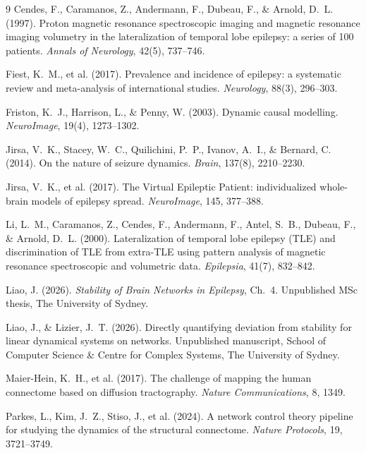 \documentclass[11pt,a4paper]{article}
\begin{document}
\begin{thebibliography}{9}
\small
{} Cendes, F., Caramanos, Z., Andermann, F., Dubeau, F., \& Arnold, D.~L. (1997). Proton magnetic resonance spectroscopic imaging and magnetic resonance imaging volumetry in the lateralization of temporal lobe epilepsy: a series of 100 patients. \emph{Annals of Neurology}, 42(5), 737--746.

 Fiest, K.~M., et al. (2017). Prevalence and incidence of
epilepsy: a systematic review and meta-analysis of international studies. \emph{Neurology},
88(3), 296--303.

 Friston, K.~J., Harrison, L., \& Penny, W. (2003). Dynamic causal modelling. \emph{NeuroImage}, 19(4), 1273--1302.

 Jirsa, V.~K., Stacey, W.~C., Quilichini, P.~P., Ivanov, A.~I., \& Bernard, C. (2014). On the nature
of seizure dynamics. \emph{Brain}, 137(8), 2210--2230.

 Jirsa, V.~K., et al. (2017). The Virtual Epileptic Patient:
individualized whole-brain models of epilepsy spread. \emph{NeuroImage}, 145, 377--388.

 Li, L.~M., Caramanos, Z., Cendes, F., Andermann, F., Antel, S.~B., Dubeau, F., \& Arnold, D.~L. (2000). Lateralization of temporal lobe epilepsy (TLE) and discrimination of TLE from extra-TLE using pattern analysis of magnetic resonance spectroscopic and volumetric data. \emph{Epilepsia}, 41(7), 832--842.

 Liao, J. (2026). \emph{Stability of Brain Networks in Epilepsy}, Ch.~4. Unpublished MSc thesis, The University of Sydney.

 Liao, J., \& Lizier, J.~T. (2026). Directly
quantifying deviation from stability for linear dynamical systems on networks. Unpublished manuscript, School of
Computer Science \& Centre for Complex Systems, The University of Sydney.

 Maier-Hein, K.~H., et al. (2017). The challenge of mapping the human connectome based on diffusion tractography. \emph{Nature Communications}, 8, 1349.

 Parkes, L., Kim, J.~Z., Stiso, J., et al. (2024). A network
control theory pipeline for studying the dynamics of the structural connectome. \emph{Nature
Protocols}, 19, 3721--3749.


\end{thebibliography}
\end{document}
